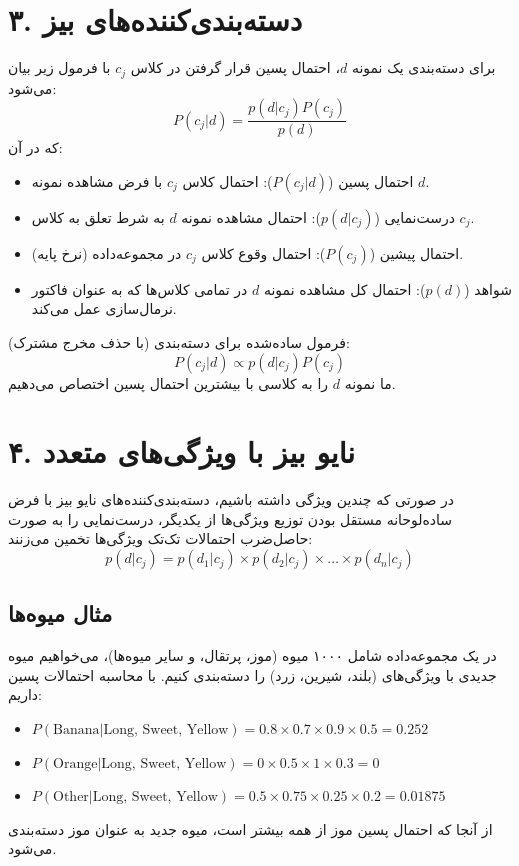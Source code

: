 \documentclass{article}
\begin{document}
\section*{۳. دسته‌بندی‌کننده‌های بیز}
برای دسته‌بندی یک نمونه $d$، احتمال پسین قرار گرفتن در کلاس $c_j$ با فرمول زیر بیان می‌شود:
\[
P(c_j|d) = \frac{p(d|c_j)P(c_j)}{p(d)}
\]
که در آن:
\begin{itemize}
    \item احتمال پسین ($P(c_j|d)$): احتمال کلاس $c_j$ با فرض مشاهده نمونه $d$.
    \item درست‌نمایی ($p(d|c_j)$): احتمال مشاهده نمونه $d$ به شرط تعلق به کلاس $c_j$.
    \item احتمال پیشین ($P(c_j)$): احتمال وقوع کلاس $c_j$ در مجموعه‌داده (نرخ پایه).
    \item شواهد ($p(d)$): احتمال کل مشاهده نمونه $d$ در تمامی کلاس‌ها که به عنوان فاکتور نرمال‌سازی عمل می‌کند.
\end{itemize}

فرمول ساده‌شده برای دسته‌بندی (با حذف مخرج مشترک):
\[
P(c_j|d) \propto p(d|c_j) P(c_j)
\]
ما نمونه $d$ را به کلاسی با بیشترین احتمال پسین اختصاص می‌دهیم.

\section*{۴. نایو بیز با ویژگی‌های متعدد}
در صورتی که چندین ویژگی داشته باشیم، دسته‌بندی‌کننده‌های نایو بیز با فرض ساده‌لوحانه مستقل بودن توزیع ویژگی‌ها از یکدیگر، درست‌نمایی را به صورت حاصل‌ضرب احتمالات تک‌تک ویژگی‌ها تخمین می‌زنند:
\[
p(d|c_j) = p(d_1|c_j) \times p(d_2|c_j) \times \dots \times p(d_n|c_j)
\]

\subsection*{مثال میوه‌ها}
در یک مجموعه‌داده شامل ۱۰۰۰ میوه (موز، پرتقال، و سایر میوه‌ها)، می‌خواهیم میوه جدیدی با ویژگی‌های (بلند، شیرین، زرد) را دسته‌بندی کنیم. با محاسبه احتمالات پسین داریم:
\begin{itemize}
    \item $P(\text{Banana} | \text{Long, Sweet, Yellow}) = 0.8 \times 0.7 \times 0.9 \times 0.5 = 0.252$
    \item $P(\text{Orange} | \text{Long, Sweet, Yellow}) = 0 \times 0.5 \times 1 \times 0.3 = 0$
    \item $P(\text{Other} | \text{Long, Sweet, Yellow}) = 0.5 \times 0.75 \times 0.25 \times 0.2 = 0.01875$
\end{itemize}
از آنجا که احتمال پسین موز از همه بیشتر است، میوه جدید به عنوان موز دسته‌بندی می‌شود.
\end{document}
